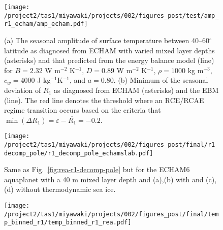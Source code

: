 \documentclass{ametsocV5}
\begin{document}
\begin{figure}
  \noindent\texttt{[image: /project2/tas1/miyawaki/projects/002/figures\_post/test/amp\_r1\_echam/amp\_echam.pdf]}\\
  \caption{(a) The seasonal amplitude of surface temperature between 40--60$^{\circ}$ latitude as diagnosed from ECHAM with varied mixed layer depths (asterisks) and that predicted from the \cite{rose2017} energy balance model (line) for $B=2.32$ W m$^{-2}$ K$^{-1}$, $D=0.89$ W m$^{-2}$ K$^{-1}$, $\rho=1000$ kg m$^{-3}$, $c_{w}=4000$ J kg$^{-1} $K$^{-1}$, and $a=0.80$. (b) Minimum of the seasonal deviation of $R_{1}$ as diagnosed from ECHAM (asterisks) and the EBM (line). The red line denotes the threshold where an RCE/RCAE regime transition occurs based on the criteria that $\min(\Delta R_1)=\varepsilon - \overline{R_1} = -0.2$.}
  \label{fig:amp-r1-echam}
\end{figure}


\begin{figure}[t]
    \noindent\texttt{[image: /project2/tas1/miyawaki/projects/002/figures\_post/final/r1\_decomp\_pole/r1\_decomp\_pole\_echamslab.pdf]}\\
    \caption{Same as Fig.~\ref{fig:rea-r1-decomp-pole} but for the ECHAM6 aquaplanet with a 40 m mixed layer depth and (a),(b) with and (c),(d) without thermodynamic sea ice.}
    \label{fig:echam-rae}
\end{figure}


\begin{figure}[t]
  \noindent\texttt{[image: /project2/tas1/miyawaki/projects/002/figures\_post/final/temp\_binned\_r1/temp\_binned\_r1\_rea.pdf]}\\
  \label{fig:cmip5-binned-r1}
\end{figure}
\end{document}
